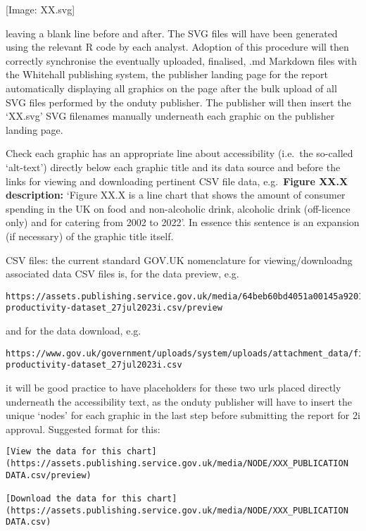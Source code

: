 \documentclass[
]{book}
\begin{document}
{[}Image: XX.svg{]}

leaving a blank line before and after. The SVG files will have been generated using the relevant R code by each analyst. Adoption of this procedure will then correctly synchronise the eventually uploaded, finalised, .md Markdown files with the Whitehall publishing system, the publisher landing page for the report automatically displaying all graphics on the page after the bulk upload of all SVG files performed by the onduty publisher. The publisher will then insert the `XX.svg' SVG filenames manually underneath each graphic on the publisher landing page.

Check each graphic has an appropriate line about accessibility (i.e.~the so-called `alt-text') directly below each graphic title and its data source and before the links for viewing and downloading pertinent CSV file data, e.g.~\textbf{Figure XX.X description:} `Figure XX.X is a line chart that shows the amount of consumer spending in the UK on food and non-alcoholic drink, alcoholic drink (off-licence only) and for catering from 2002 to 2022'. In essence this sentence is an expansion (if necessary) of the graphic title itself.

CSV files: the current standard GOV.UK nomenclature for viewing/downloadng associated data CSV files is, for the data preview, e.g.~

\begin{verbatim}
https://assets.publishing.service.gov.uk/media/64beb60bd4051a00145a9201/foodchainanalysis-productivity-dataset_27jul2023i.csv/preview
\end{verbatim}

and for the data download, e.g.

\begin{verbatim}
https://www.gov.uk/government/uploads/system/uploads/attachment_data/file/1173363/foodchainanalysis-productivity-dataset_27jul2023i.csv
\end{verbatim}

it will be good practice to have placeholders for these two urls placed directly underneath the accessibility text, as the onduty publisher will have to insert the unique `nodes' for each graphic in the last step before submitting the report for 2i approval. Suggested format for this:

\begin{verbatim}
[View the data for this chart](https://assets.publishing.service.gov.uk/media/NODE/XXX_PUBLICATION DATA.csv/preview)  

[Download the data for this chart](https://assets.publishing.service.gov.uk/media/NODE/XXX_PUBLICATION DATA.csv)
\end{verbatim}
\end{document}
